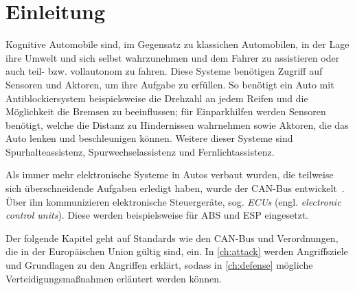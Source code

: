 
\chapter{Einleitung}
Kognitive Automobile sind, im Gegensatz zu klassichen Automobilen, in der Lage
ihre Umwelt und sich selbst wahrzunehmen und dem Fahrer zu assistieren oder
auch teil- bzw. vollautonom zu fahren. Diese Systeme benötigen Zugriff auf
Sensoren und Aktoren, um ihre Aufgabe zu erfüllen. So benötigt ein Auto mit
Antiblockiersystem beispielsweise die Drehzahl an jedem Reifen und die
Möglichkeit die Bremsen zu beeinflussen; für Einparkhilfen werden Sensoren
benötigt, welche die Distanz zu Hindernissen wahrnehmen sowie Aktoren, die das
Auto lenken und beschleunigen können. Weitere dieser Systeme sind
Spurhalteassistenz, Spurwechselassistenz und Fernlichtassistenz.

Als immer mehr elektronische Systeme in Autos verbaut wurden, die teilweise
sich überschneidende Aufgaben erledigt haben, wurde der CAN-Bus
entwickelt~\cite{Kiencke1986}. Über ihn kommunizieren elektronische
Steuergeräte, sog. \textit{ECUs} (engl. \textit{electronic control units}).
Diese werden beispielsweise für ABS und ESP eingesetzt.

Der folgende Kapitel geht auf Standards wie den CAN-Bus und Verordnungen, die
in der Europäischen Union gültig sind, ein. In \cref{ch:attack} werden
Angriffsziele und Grundlagen zu den Angriffen erklärt, sodass in
\cref{ch:defense} mögliche Verteidigungsmaßnahmen erläutert werden können.